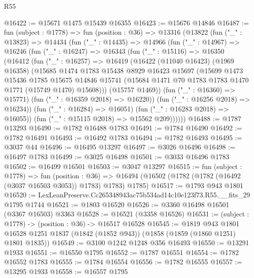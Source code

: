 \begin{lexlean}{R55}
\begin{coremodule}
@16422 := @15671 @1475 @15439 @16355
@16423 := @15676 @14846
@16487 := fun (subject : @1778) =>
  fun (position : @36) =>
  @13316
    (@13822
      (fun ("_" : @13823) =>
      @14434
        (fun ("_" : @14435) =>
        @14966
          (fun ("_" : @14967) =>
          @16246
            (fun ("_" : @16247) =>
            @16343
              (fun ("_" : @15116) =>
              @16350
                (@16412
                  (fun ("_" : @16257) =>
                  @16419
                    (@16422
                      (@11040 @16423)
                      (@1969 @16358)
                      (@15685
                        @1474
                        @1783
                        @15438
                        @8929
                        @16423
                        @15697
                        (@15699
                          @1473
                          @15436
                          @1785
                          @15675
                          @14846
                          @15741
                          (@15684 @1471 @70 @1783 @1783 @1470 @1771 (@15749 @1470) @15608)))
                      (@15757 @1469))
                    (fun ("_" : @16360) => @15771)
                    (fun ("_" : @16359 @2018) => @16220))
                  (fun ("_" : @16256 @2018) => @16234))
                (fun ("_" : @16284) => @16051)
                (fun ("_" : @16283 @2018) => @16055))
              (fun ("_" : @15115 @2018) => @15562 @209))))))
@16488 := @1787 @13293
@16490 := @1782 @16488 @1783
@16491 := @1784 @16490
@16492 := @1782 @16491
@16493 := @16492 @1783
@16494 := @1782 @16493
@16495 := @3037 @44
@16496 := @16495 @13297
@16497 := @3026 @16496
@16498 := @16497 @1783
@16499 := @3025 @16498
@16501 := @3033 @16496 @1783
@16502 := @16499 @16501
@16503 := @3047 @13297
@16515 := fun (subject : @1778) =>
  fun (position : @36) =>
  @16494 (@16502 (@1782 (@1782 (@16492 (@3037 @16503 @3053)) @1783) @1783) @1785)
@16517 := @1793 @943 @1801
@16520 := LexLeanPreserve.Cc265348943ac75b534ad14c10e123f73.R55.__fits_29 @1795 @1744
@16521 := @1803 @16520
@16526 := @3360 @16498 @16501 (@3367 @16503) @3363
@16528 := @16521 (@3358 @16526)
@16531 := (subject : @1778) -> (position : @36) -> @16517 @16528
@16545 := @1819
    @943
    @1801
    @16528
    @1251
    @1837
    (@1842 (@1852 @943))
    (@1858 (@1859 (@1860 @1251) @1801 @1835))
@16549 := @3100 @1242 @1248 @356 @16493
@16550 := @13291 @1933
@16551 := @16550 @1795
@16552 := @1787 @16551
@16554 := @1782 @16552 @1783
@16555 := @1784 @16554
@16556 := @1782 @16555
@16557 := @13295 @1933
@16558 := @16557 @1795

\end{coremodule}
\end{lexlean}
